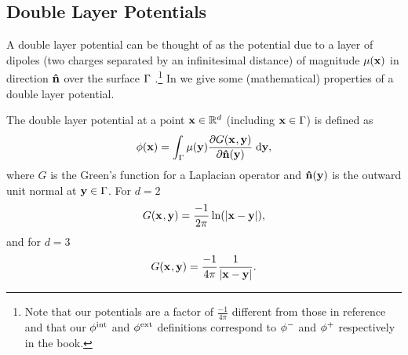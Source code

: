 \subsection{Double Layer Potentials}
\label{sec:double-layer-potent}

A double layer potential can be thought of as the potential due to a layer of dipoles (\ie two charges separated by an infinitesimal distance) of magnitude $\mu(\boldsymbol{\mathrm{x}})$ in direction $\boldsymbol{\mathrm{\hat{n}}}$ over the surface ${\Gamma}$ \cite{Sternberg1946}.\footnote{Note that our potentials are a factor of $\frac{-1}{4 \pi}$ different from those in reference \cite{Sternberg1946} and that our $\phi^{\mathrm{int}}$ and $\phi^{\mathrm{ext}}$ definitions correspond to $\phi^-$ and $\phi^+$ respectively in the book.}
In  we give some (mathematical) properties of a double layer potential.

The double layer potential at a point $\boldsymbol{\mathrm{x}} \in \mathbb{R}^d$ (including $\boldsymbol{\mathrm{x}} \in {\Gamma}$) is defined as \cite{eom_double_layer_potential}
\begin{equation}
  \label{eq:3}
  \phi(\boldsymbol{\mathrm{x}}) = \int_{{\Gamma}} \mu(\boldsymbol{\mathrm{y}}) \frac{\partial G(\boldsymbol{\mathrm{x}}_{},\boldsymbol{\mathrm{y}})}{\partial \boldsymbol{\mathrm{\hat{n}}}(\boldsymbol{\mathrm{y}})} {\; \mathrm{{d}}} \boldsymbol{\mathrm{y}},
\end{equation}
where $G$ is the Green's function for a Laplacian operator and $\boldsymbol{\mathrm{\hat{n}}}(\boldsymbol{\mathrm{y}})$ is the outward unit normal at $\boldsymbol{\mathrm{y}} \in {\Gamma}$.
For $d=2$
\begin{equation}
  G(\boldsymbol{\mathrm{x}}_{},\boldsymbol{\mathrm{y}}) = \dfrac{-1}{2\pi}\ln(\left|{\boldsymbol{\mathrm{x}} - \boldsymbol{\mathrm{y}}} \right|),
  \label{eqn:greenslaplacian2d}
\end{equation}
and for $d=3$
\begin{equation}
  G(\boldsymbol{\mathrm{x}}_{},\boldsymbol{\mathrm{y}}) = \dfrac{-1}{4 \pi} \dfrac{1}{\left|{\boldsymbol{\mathrm{x}} - \boldsymbol{\mathrm{y}}} \right|}.
  \label{eqn:greenslaplacian3d}
\end{equation}


